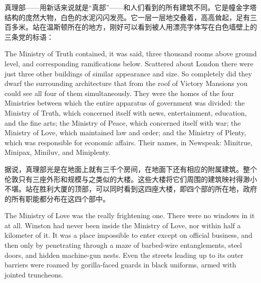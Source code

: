 \begin{paracol}{2}
真理部——用新话来说就是``真部''——和人们看到的所有建筑不同。它是幢金字塔结构的庞然大物，白色的水泥闪闪发亮。它一层一层地交叠着，高高耸起，足有三百多米。站在温斯顿所在的地方，刚好可以看到被人用漂亮字体写在白色墙壁上的三条党的标语：

\switchcolumn*


\switchcolumn


\switchcolumn*

The Ministry of Truth contained, it was said, three thousand rooms above
ground level, and corresponding ramifications below. Scattered about
London there were just three other buildings of similar appearance and
size. So completely did they dwarf the surrounding architecture that
from the roof of Victory Mansions you could see all four of them
simultaneously. They were the homes of the four Ministries between which
the entire apparatus of government was divided: the Ministry of Truth,
which concerned itself with news, entertainment, education, and the fine
arts; the Ministry of Peace, which concerned itself with war; the
Ministry of Love, which maintained law and order; and the Ministry of
Plenty, which was responsible for economic affairs. Their names, in
Newspeak: Minitrue, Minipax, Miniluv, and Miniplenty.

\switchcolumn

据说，真理部光是在地面上就有三千个房间，在地面下还有相应的附属建筑。整个伦敦只有三座外形和规模与之类似的大楼。这些大楼将它们周围的建筑映衬得渺小不堪。站在胜利大厦的顶部，可以同时看到这四座大楼，即四个部的所在地，政府的所有职能都分布在这四个部中。

\switchcolumn*

The Ministry of Love was the really frightening one. There were no
windows in it at all. Winston had never been inside the Ministry of
Love, nor within half a kilometer of it. It was a place impossible to
enter except on official business, and then only by penetrating through
a maze of barbed-wire entanglements, steel doors, and hidden machine-gun
nests. Even the streets leading up to its outer barriers were roamed by
gorilla-faced guards in black uniforms, armed with jointed truncheons.

\switchcolumn


\end{paracol}

